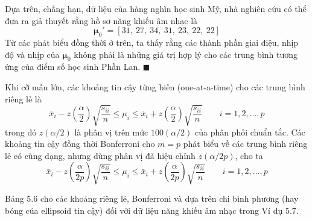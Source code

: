 Dựa trên, chẳng hạn, dữ liệu của hàng nghìn học sinh Mỹ, nhà nghiên cứu có thể đưa ra giả thuyết rằng hồ sơ năng khiếu âm nhạc là
\[
    \boldsymbol{\mu}_0' = [31,\ 27,\ 34,\ 31,\ 23,\ 22,\ 22]
\]
Từ các phát biểu đồng thời ở trên, ta thấy rằng các thành phần giai điệu, nhịp độ và nhịp của $\boldsymbol{\mu}_0$ không phải là những giá trị hợp lý cho các trung bình tương ứng của điểm số học sinh Phần Lan. \hfill$\blacksquare$

\medskip
Khi cỡ mẫu lớn, các khoảng tin cậy từng biến (one-at-a-time) cho các trung bình riêng lẻ là
\[
    \bar{x}_i - z\!\left(\frac{\alpha}{2}\right)\sqrt{\frac{s_{ii}}{n}} \le \mu_i \le \bar{x}_i + z\!\left(\frac{\alpha}{2}\right)\sqrt{\frac{s_{ii}}{n}}
    \qquad i=1,2,\dots,p
\]
trong đó $z(\alpha/2)$ là phân vị trên mức $100(\alpha/2)$ của phân phối chuẩn tắc. Các khoảng tin cậy đồng thời Bonferroni cho $m=p$ phát biểu về các trung bình riêng lẻ có cùng dạng, nhưng dùng phân vị đã hiệu chỉnh $z(\alpha/2p)$, cho ta
\[
    \bar{x}_i - z\!\left(\frac{\alpha}{2p}\right)\sqrt{\frac{s_{ii}}{n}} \le \mu_i \le \bar{x}_i + z\!\left(\frac{\alpha}{2p}\right)\sqrt{\frac{s_{ii}}{n}}
    \qquad i=1,2,\dots,p
\]

Bảng 5.6 cho các khoảng riêng lẻ, Bonferroni và dựa trên chi bình phương (hay bóng của ellipsoid tin cậy) đối với dữ liệu năng khiếu âm nhạc trong Ví dụ 5.7.

